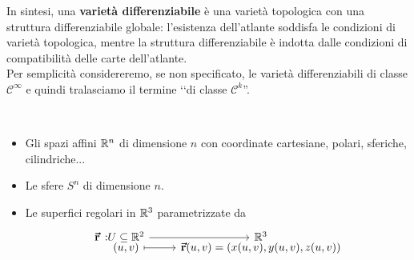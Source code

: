 In sintesi, una \textbf{varietà differenziabile} è una varietà topologica con una struttura differenziabile globale: l'esistenza dell'atlante soddisfa le condizioni di varietà topologica, mentre la struttura differenziabile è indotta dalle condizioni di compatibilità delle carte dell'atlante.\\
Per semplicità considereremo, se non specificato, le varietà differenziabili di classe $\mathcal{C}^{\infty}$ e quindi tralasciamo il termine ‘‘di classe $\mathcal{C}^k$''.
\begin{examples}~
	\begin{itemize}
		\item Gli spazi affini $\mathbb{R}^n$ di dimensione $n$ con coordinate cartesiane, polari, sferiche, cilindriche...
		\item Le sfere $S^n$ di dimensione $n$.
		\item Le superfici regolari in $\mathbb{R}^3$ parametrizzate da
		\begin{equation*}
			\funztot[\vba{r}]{U\subseteq\realset^2}{\realset^3}{(u,v)}{\vba{r}(u,v)=(x(u,v),y(u,v),z(u,v))}
		\end{equation*}
	\end{itemize}
\end{examples}

